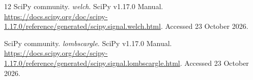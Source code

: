 \begin{thebibliography}{12}
SciPy community. \emph{welch}. SciPy v1.17.0 Manual.
\url{https://docs.scipy.org/doc/scipy-1.17.0/reference/generated/scipy.signal.welch.html}.
Accessed 23 October 2026.

SciPy community. \emph{lombscargle}. SciPy v1.17.0 Manual.
\url{https://docs.scipy.org/doc/scipy-1.17.0/reference/generated/scipy.signal.lombscargle.html}.
Accessed 23 October 2026.
\end{thebibliography}
